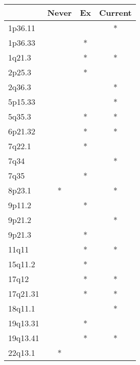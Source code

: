 \begin{tabular}{lccc}
\toprule
{} & Never & Ex & Current \\
\midrule
1p36.11  &       &    &       * \\
1p36.33  &       &  * &         \\
1q21.3   &       &  * &       * \\
2p25.3   &       &  * &         \\
2q36.3   &       &    &       * \\
5p15.33  &       &    &       * \\
5q35.3   &       &  * &       * \\
6p21.32  &       &  * &       * \\
7q22.1   &       &  * &         \\
7q34     &       &    &       * \\
7q35     &       &  * &         \\
8p23.1   &     * &    &       * \\
9p11.2   &       &  * &         \\
9p21.2   &       &    &       * \\
9p21.3   &       &  * &         \\
11q11    &       &  * &       * \\
15q11.2  &       &  * &         \\
17q12    &       &  * &       * \\
17q21.31 &       &  * &       * \\
18q11.1  &       &    &       * \\
19q13.31 &       &  * &         \\
19q13.41 &       &  * &       * \\
22q13.1  &     * &    &         \\
\bottomrule
\end{tabular}
